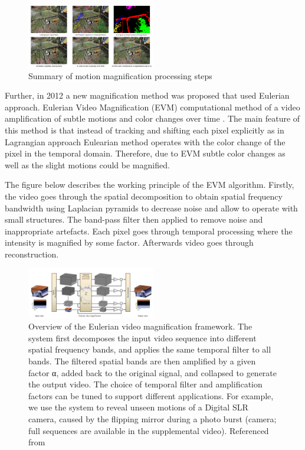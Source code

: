 \documentclass{IEEEtran}
\begin{document}
\begin{figure}[h]
	\centering
	\includegraphics[width=0.5\textwidth]{Liu}
	\caption{Summary of motion magnification processing steps \cite{Liu:2005:MM:1073204.1073223}}
	\label{fig:Liu}
\end{figure}

Further, in 2012 a new magnification method was proposed that used Eulerian approach. Eulerian Video Magnification (EVM) computational method of a video amplification of subtle motions and color changes over time \cite{Wu:2012:EVM:2185520.2185561}. The main feature of this method is that instead of tracking and shifting each pixel explicitly as in Lagrangian approach Eulearian method operates with the color change of the pixel in the temporal domain. Therefore, due to EVM subtle color changes as well as the slight motions could be magnified.

The figure below describes the working principle of the EVM algorithm. Firstly, the video goes through the spatial decomposition to obtain spatial frequency bandwidth using Laplacian pyramids to decrease noise and allow to operate with small structures. The band-pass filter then applied to remove noise and inappropriate artefacts. Each pixel goes through temporal processing where the intensity is magnified by some factor. Afterwards video goes through reconstruction.

\begin{figure}[h]
	\centering
	\includegraphics[width=0.5\textwidth]{EVM}
	\caption{Overview of the Eulerian video magnification framework. The system first decomposes the input video sequence into different spatial frequency bands, and applies the same temporal filter to all bands. The filtered spatial bands are then amplified by a given factor α, added back to the original signal, and collapsed to generate the output video. The choice of temporal filter and amplification factors can be tuned to support different applications. For example, we use the system to reveal unseen motions of a Digital SLR camera, caused by the flipping mirror during a photo burst (camera; full sequences are available in the supplemental video). Referenced from \cite{Wu:2012:EVM:2185520.2185561}}
	\label{fig:EVM}
\end{figure}
\end{document}
